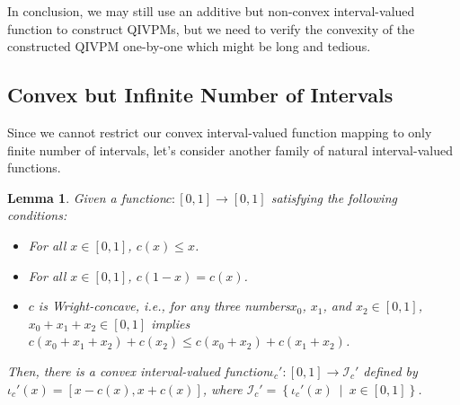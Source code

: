 \documentclass[12pt]{iopart}
\theoremstyle{plain}
\newtheorem{lemma}[thm]{Lemma}
\theoremstyle{definition}
\theoremstyle{remark}
\newcommand{\set}[2]{\ensuremath{\left\{ {#1}~\middle|~{#2}\right\} }}
\newcommand{\nb}{\nolinebreak[3] }
\begin{document}
In conclusion, we may still use an additive but non-convex interval-valued
function to construct QIVPMs, but we need to verify the convexity
of the constructed QIVPM one-by-one which might be long and tedious.

\subsection{Convex but Infinite Number of Intervals}

Since we cannot restrict our convex interval-valued function mapping
to only finite number of intervals, let's consider another family
of natural interval-valued functions.

\begin{lemma}Given a function\nb$c:\left[0,1\right]\rightarrow\left[0,1\right]$
satisfying the following conditions:
\begin{itemize}
\item For all $x\in\left[0,1\right]$, $c\left(x\right)\le x$.
\item For all $x\in\left[0,1\right]$, $c\left(1-x\right)=c\left(x\right)$.
\item $c$ is Wright-concave\nb\cite{Brzdek_2014}, i.e., for any three
numbers\nb$x_{0}$, $x_{1}$, and $x_{2}\in\left[0,1\right]$, $x_{0}+x_{1}+x_{2}\in\left[0,1\right]$
implies $c\left(x_{0}+x_{1}+x_{2}\right)+c\left(x_{2}\right)\le c\left(x_{0}+x_{2}\right)+c\left(x_{1}+x_{2}\right)$.
\end{itemize}
Then, there is a convex interval-valued function\nb$\iota_{c}':\left[0,1\right]\rightarrow\mathscr{I}_{c}'$
defined by $\iota_{c}'\left(x\right)=\left[x-c\left(x\right),x+c\left(x\right)\right]$,
where $\mathscr{I}_{c}'=\set{\iota_{c}'\left(x\right)}{x\in\left[0,1\right]}$.\end{lemma}
\end{document}
